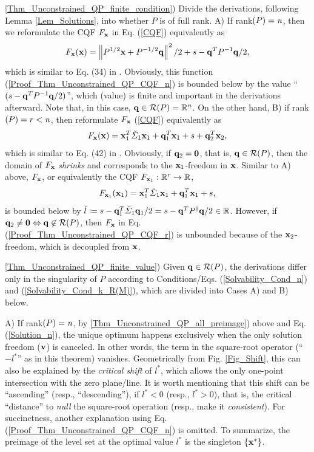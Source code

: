 \documentclass{imaman}
\newcommand{\beq}{\begin{eqnarray}}
\newcommand{\eeq}{\end{eqnarray}}
\newcommand{\bfx}{{\bf x}}
\newcommand{\bfq}{{\bf q}}
\newcommand{\bfv}{{\bf v}}
\newcommand{\bfzero}{{\bf 0}}
\newcommand{\real}{\mathbb{R}}
\newcommand{\calR}{{\mathcal R}}
\newcommand{\itn}{{\it n}}
\newcommand{\itr}{{\it r}}
\numberwithin{equation}{section}
\begin{document}
\noindent\ref{Thm_Unconstrained_QP_finite_condition}) Divide the derivations, following Lemma \ref{Lem_Solutions}, into whether $P$ is of full rank. A) If rank$(P)=\itn$, then we reformulate the CQF $F_\bfx$ in Eq. (\ref{CQF}) equivalently as
\beq
F_\bfx(\bfx)=\left\Vert P^{1/2}\bfx+P^{-{1/2}}\bfq\right\Vert^2/2+s-\bfq^TP^{-1}\bfq/2,
\label{Proof_Thm_Unconstrained_QP_CQF_n}
\eeq
which is similar to Eq. (34) in \cite{LiLiHs:20}. Obviously, this function (\ref{Proof_Thm_Unconstrained_QP_CQF_n}) is bounded below by the value ``$(s-\bfq^TP^{-1}\bfq/2)$'', which (value) is finite and important in the derivations afterward. Note that, in this case, $\bfq\in \calR(P)=\real^\itn$. On the other hand, B) if rank$(P)=r<\itn$, then reformulate $F_\bfx$ (\ref{CQF}) equivalently as
\beq
F_\bfx(\bfx)=\bfx_1^T\breve\Sigma_1\bfx_1+\bfq_1^T\bfx_1+s+\bfq_2^T\bfx_2,
\label{Proof_Thm_Unconstrained_QP_CQF_r}
\eeq
which is similar to Eq. (42) in \cite{LiLiHs:20}. Obviously, if $\bfq_2=\bfzero$, that is, $\bfq\in\calR(P)$, then the domain of $F_\bfx$ \textit{shrinks} and corresponds to the $\bfx_1$-freedom in $\bfx$. Similar to A) above, $F_\bfx$, or equivalently the CQF $F_{\bfx_1}:\real^\itr\rightarrow\real$,
\beq
F_{\bfx_1}(\bfx_1)=\bfx_1^T\breve\Sigma_1\bfx_1+\bfq_1^T\bfx_1+s,
\label{Proof_Thm_Unconstrained_QP_CQF_r_x1}
\eeq
is bounded below by $\breve l\coloneqq s-\bfq_1^T\breve\Sigma_1\bfq_1/2=s-\bfq^T P^\dagger\bfq/2\in\real$. However, if $\bfq_2\ne\bfzero\Leftrightarrow \bfq\not\in\calR(P)$, then $F_\bfx$ in Eq. (\ref{Proof_Thm_Unconstrained_QP_CQF_r}) is unbounded because of the $\bfx_2$-freedom, which is decoupled from $\bfx$.\vspace{0.16cm}

\noindent\ref{Thm_Unconstrained_QP_finite_value}) Given $\bfq\in \calR(P)$, the derivations differ only in the singularity of $P$ according to Conditions/Eqs. (\ref{Solvability_Cond_n}) and (\ref{Solvability_Cond_k_R(M)}), which are divided into Cases A) and B) below.\vspace{0.16cm}

\noindent A) If rank$(P)=\itn$, by \ref{Thm_Unconstrained_QP_all_preimage}) above and Eq. (\ref{Solution_n}), the unique optimum happens exclusively when the only solution freedom ($\bfv$) is canceled. In other words, the term in the square-root operator (``$-l^*$'' as in this theorem) vanishes. Geometrically from Fig. \ref{Fig_Shift}, this can also be explained by the \textit{critical shift} of $l^*$, which allows the only one-point intersection with the zero plane/line. It is worth mentioning that this shift can be ``ascending'' (resp., ``descending''), if $l^*<0$ (resp., $l^*>0$), that is, the critical ``distance'' to \textit{null} the square-root operation (resp., make it \textit{consistent}). For succinctness, another explanation using Eq. (\ref{Proof_Thm_Unconstrained_QP_CQF_n}) is omitted. To summarize, the preimage of the level set at the optimal value $l^*$ is the singleton $\{\bfx^*\}$.\vspace{0.16cm}
\end{document}
